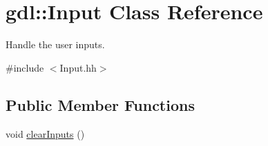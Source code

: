 \hypertarget{classgdl_1_1_input}{\section{gdl\-:\-:Input Class Reference}
\label{classgdl_1_1_input}
}


Handle the user inputs.  




{\ttfamily \#include $<$Input.\-hh$>$}

\subsection*{Public Member Functions}
\begin{DoxyCompactItemize}
\item 
\hypertarget{classgdl_1_1_input_a2cbd704d4c1069ac1fd7c4fb91d30b09}{void \hyperlink{classgdl_1_1_input_a2cbd704d4c1069ac1fd7c4fb91d30b09}{clear\-Inputs} ()}\label{classgdl_1_1_input_a2cbd704d4c1069ac1fd7c4fb91d30b09}


\end{DoxyCompactItemize}
